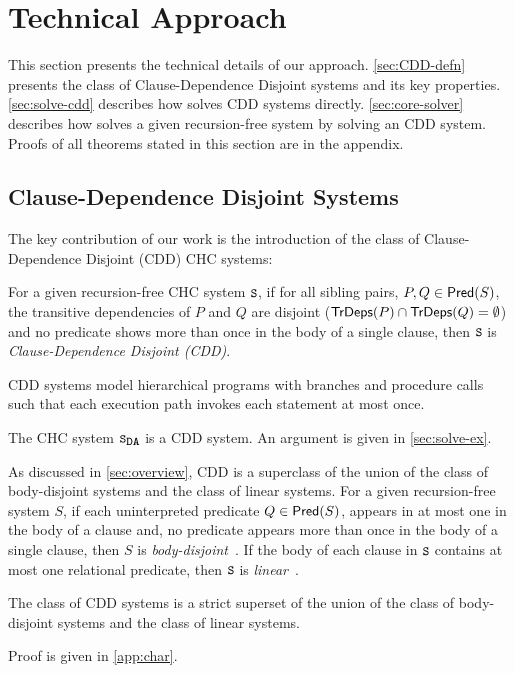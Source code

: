 \section{Technical Approach}
\label{sec:approach}
%
This section presents the technical details of our approach.
%
\autoref{sec:CDD-defn} presents the class of Clause-Dependence Disjoint
systems and its key properties.
%
\autoref{sec:solve-cdd} describes how \sys solves CDD systems
directly.
%
\autoref{sec:core-solver} describes how \sys solves a given
recursion-free system by solving an CDD system.
%
Proofs of all theorems stated in this section are in the appendix.

\subsection{Clause-Dependence Disjoint Systems}
\label{sec:CDD-defn}
%
The key contribution of our work is the introduction of the class of
Clause-Dependence Disjoint (CDD) CHC systems:
%
\begin{defn}
  \label{defn:cdds}
  For a given recursion-free CHC system $\cc{S}$,
  if for all sibling pairs, $P, Q \in \mathsf{Pred}( S )$,
  the transitive dependencies of $P$ and $Q$ are disjoint ($\mathsf{TrDeps}(P) \cap
  \mathsf{TrDeps}(Q) = \emptyset$)
  and no predicate shows more than once in the body of a single clause,
  then $\cc{S}$ is \emph{Clause-Dependence Disjoint (CDD)}.
\end{defn}
%
CDD systems model hierarchical programs with branches and procedure calls such
that each execution path invokes each statement at most once.
%
\begin{ex}
  The CHC system $\mcchc$ is a CDD system. An argument is given in
  \autoref{sec:solve-ex}.
\end{ex}

As discussed in \autoref{sec:overview}, CDD is a superclass of the union of
the class of body-disjoint systems and the class of linear systems.
%
For a given recursion-free system $S$, if each uninterpreted predicate $Q \in
\mathsf{Pred}( S )$, appears in at most one in the body of a clause and, no
predicate appears more than once in the body of a single clause,
then $S$ is \emph{body-disjoint}~\cite{rummer13a,rummer13b}.
%
If the body of each clause in $\cc{S}$ contains at most one relational
predicate, then $\cc{S}$ is \emph{linear}~\cite{albarghouthi12a}.

\begin{thm}
\label{thm:cdd-contains}
  The class of CDD systems is a strict superset of the union of the
  class of body-disjoint systems and the class of linear systems.
\end{thm}
%
Proof is given in \autoref{app:char}.


